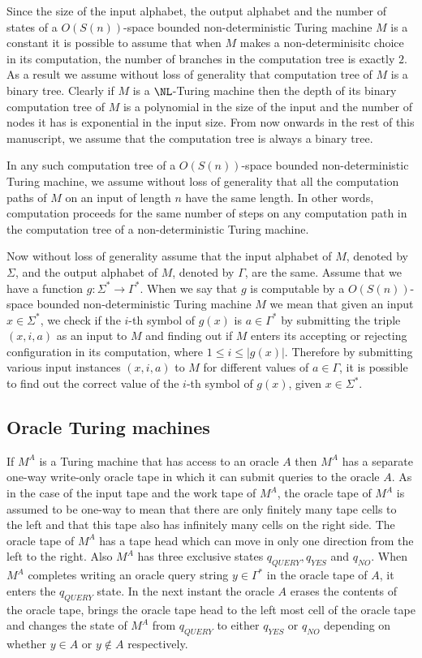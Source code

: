 \documentclass{amsbook}
\theoremstyle{definition}
\theoremstyle{remark}
\numberwithin{section}{chapter}
\numberwithin{equation}{chapter}
\begin{document}
Since the size of the input alphabet, the output alphabet and the number of states of a $O(S(n))$-space bounded non-deterministic Turing machine $M$ is a constant it is possible to assume that when $M$ makes a non-determinisitc choice in its computation, the number of branches in the computation tree is exactly $2$. As a result we assume without loss of generality that computation tree of $M$ is a binary tree. Clearly if $M$ is a $\NL$-Turing machine then the depth of its binary computation tree of $M$ is a polynomial in the size of the input and the number of nodes it has is exponential in the input size. From now onwards in the rest of this manuscript, we assume that the computation tree is always a binary tree.

In any such computation tree of a $O(S(n))$-space bounded non-deterministic Turing machine, we assume without loss of generality that all the computation paths of $M$ on an input of length $n$ have the same length. In other words, computation proceeds for the same number of steps on any computation path in the computation tree of a non-deterministic Turing machine.

Now without loss of generality assume that the input alphabet of $M$, denoted by $\Sigma$, and the output alphabet of $M$, denoted by $\Gamma$, are the same. Assume that we have a function $g:\Sigma^*\rightarrow\Gamma^*$. When we say that $g$ is computable by a $O(S(n))$-space bounded non-deterministic Turing machine $M$ we mean that given an input $x\in\Sigma^*$, we check if the $i$-th symbol of $g(x)$ is $a\in\Gamma^*$ by submitting the triple $(x,i,a)$ as an input to $M$ and finding out if $M$ enters its accepting or rejecting configuration in its computation, where $1\leq i\leq |g(x)|$. Therefore by submitting various input instances $(x,i,a)$ to $M$ for different values of $a\in\Gamma$, it is possible to find out the correct value of the $i$-th symbol of $g(x)$, given $x\in\Sigma^*$.

\subsection{Oracle Turing machines}
If $M^A$ is a Turing machine that has access to an oracle $A$ then $M^A$ has a separate one-way write-only oracle tape in which it can submit queries to the oracle $A$. As in the case of the input tape and the work tape of $M^A$, the oracle tape of $M^A$ is assumed to be one-way to mean that there are only finitely many tape cells to the left and that this tape also has  infinitely many cells on the right side. The oracle tape of $M^A$ has a tape head which can move in only one direction from the left to the right. Also $M^A$ has three exclusive states $q_{QUERY},q_{YES}$ and $q_{NO}$. When $M^A$ completes writing an oracle query string $y\in\Gamma^*$ in the oracle tape of $A$, it enters the $q_{QUERY}$ state. In the next instant the oracle $A$ erases the contents of the oracle tape, brings the oracle tape head to the left most cell of the oracle tape and changes the state of $M^A$ from $q_{QUERY}$ to either $q_{YES}$ or $q_{NO}$ depending on whether $y\in A$ or $y\not\in A$ respectively.
\end{document}
